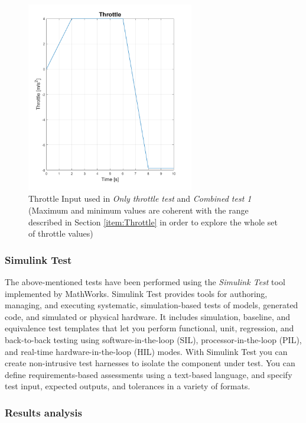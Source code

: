 \begin{figure}[H]
    \centering
    \includegraphics[width=0.65\textwidth]{Figures/InputThrottle.png}
    \caption{Throttle Input used in \textit{Only throttle test} and \textit{Combined test 1} (Maximum and minimum values are coherent with the range described in Section \ref{item:Throttle} in order to explore the whole set of throttle values)}
      \label{fig:InputThrottle}
\end{figure}






\subsubsection{Simulink Test}
The above-mentioned tests have been performed using the \textit{Simulink Test} tool implemented by MathWorks. Simulink Test provides tools for authoring, managing, and executing systematic, simulation-based tests of models, generated code, and simulated or physical hardware. It includes simulation, baseline, and equivalence test templates that let you perform functional, unit, regression, and back-to-back testing using software-in-the-loop (SIL), processor-in-the-loop (PIL), and real-time hardware-in-the-loop (HIL) modes. With Simulink Test you can create non-intrusive test harnesses to isolate the component under test. You can define requirements-based assessments using a text-based language, and specify test input, expected outputs, and tolerances in a variety of formats. \cite{SimulinkTest}

\subsubsection{Results analysis}

